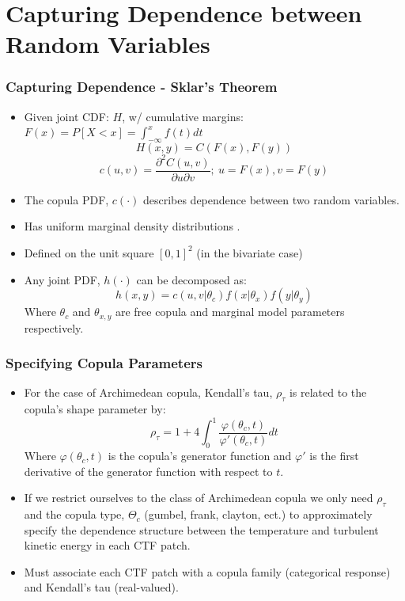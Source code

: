 \documentclass[t, pdftex]{beamer}
\begin{document}
\section{Capturing Dependence between Random Variables}
\begin{frame}
\frametitle{Capturing Dependence - Sklar's Theorem}
\begin{itemize}
\item Given joint CDF: $H$, w/ cumulative margins: $F(x)=P[X < x] = \int_{-\infty}^{x}f(t)dt$
\[
H(x,y) = C(F(x), F(y))
\]
\[
c(u, v) = \frac{\partial^2 C(u, v)}{\partial u \partial v};\ u=F(x), v=F(y)
\]
\item  The copula PDF, $c(\cdot)$ describes dependence between two random variables.
\item  Has uniform marginal density distributions \cite{Nelsen2006}.
\item  Defined on the unit square $[0, 1]^2$ (in the bivariate case)
\item  Any joint PDF, $h(\cdot)$ can be decomposed as: \\
\[
h(x, y) = c(u, v |\theta_c)f(x|\theta_x)f(y|\theta_y)
\]
Where $\theta_c$ and $\theta_{x,y}$ are free copula and marginal model parameters respectively.
\end{itemize}
\end{frame}

\begin{frame}
\frametitle{Specifying Copula Parameters}
\begin{itemize}
\item For the case of Archimedean copula, Kendall's tau, $\rho_\tau$ is
related to the copula's shape parameter by:
\[
\rho_\tau = 1 + 4 \int_0^1 \frac{\varphi(\theta_c,t)}{\varphi'(\theta_c, t)}dt
\]
Where $\varphi(\theta_c, t)$ is the copula's generator function and $\varphi'$ is the first derivative of the generator function with respect to $t$.
\item  If we restrict ourselves to the class of  Archimedean copula we only need $\rho_\tau$ and the copula type, $\Theta_c$ (gumbel, frank, clayton, ect.) to approximately specify the dependence structure between the temperature and turbulent kinetic energy in each CTF patch.
\item Must associate each CTF patch with a copula family (categorical response) and Kendall's tau (real-valued).
\end{itemize}
\end{frame}
\end{document}
